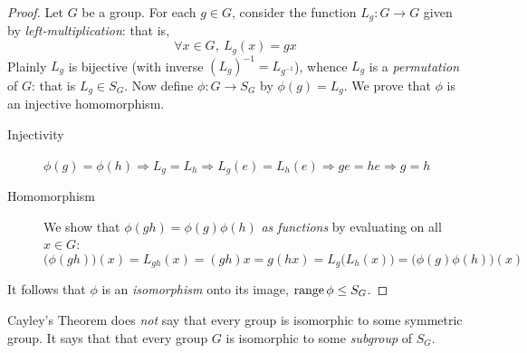 \begin{proof}
	Let $G$ be a group. For each $g\in G$, consider the function $L_g:G\to G$ given by \emph{left-multiplication}: that is,
	\[
		\forall x\in G,\ L_g(x)=gx
	\]
	Plainly $L_g$ is bijective (with inverse $(L_g)^{-1}=L_{g^{-1}}$), whence $L_g$ is a \emph{permutation} of $G$: that is $L_g\in S_G$. Now define $\phi:G\to S_G$ by $\phi(g)=L_g$. We prove that $\phi$ is an injective homomorphism.
	\begin{description}
		\item[Injectivity] $\phi(g)=\phi(h)\Longrightarrow L_g=L_h\Longrightarrow L_g(e)=L_h(e)\Longrightarrow ge=he\Longrightarrow g=h$
		\item[Homomorphism] We show that $\phi(gh)=\phi(g)\phi(h)$ \emph{as functions} by evaluating on all $x\in G$:
		\[
			\bigl(\phi(gh)\bigr)(x) =L_{gh}(x)=(gh)x=g(hx) =L_g\bigl(L_h(x)\bigr)=\bigl(\phi(g)\phi(h)\bigr)(x)
		\]
	\end{description}
	It follows that $\phi$ is an \emph{isomorphism} onto its image, $\operatorname{range}\phi\le S_G$.
\end{proof}

Cayley's Theorem does \emph{not} say that every group is isomorphic to some symmetric group. It says that that every group $G$ is isomorphic to some \emph{subgroup} of $S_G$.



